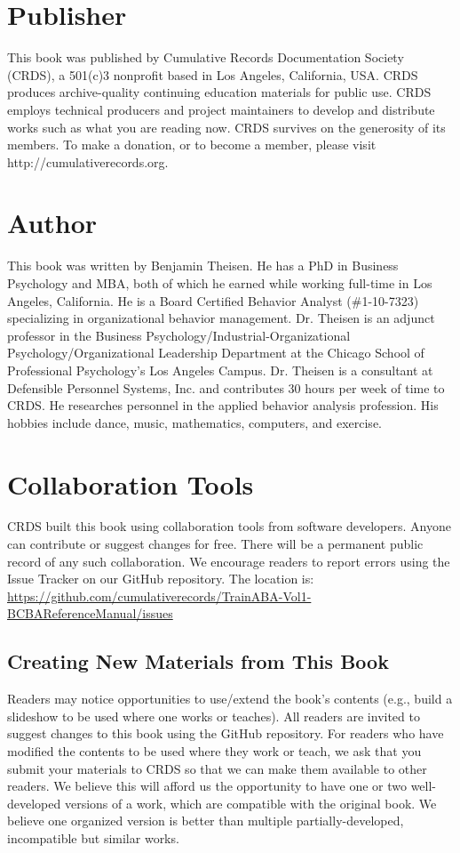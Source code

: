 \documentclass[float=false, crop=false]{standalone}
\begin{document}
\section{Publisher}
This book was published by Cumulative Records Documentation Society (CRDS), a 501(c)3 nonprofit based in Los Angeles, California, USA. CRDS produces archive-quality continuing education materials for public use. CRDS employs technical producers and project maintainers to develop and distribute works such as what you are reading now. CRDS survives on the generosity of its members. To make a donation, or to become a member, please visit http://cumulativerecords.org.

\section{Author}
This book was written by Benjamin Theisen. He has a PhD in Business Psychology and MBA, both of which he earned while working full-time in Los Angeles, California. He is a Board Certified Behavior Analyst (\#1-10-7323) specializing in organizational behavior management. Dr. Theisen is an adjunct professor in the Business Psychology/Industrial-Organizational Psychology/Organizational Leadership Department at the Chicago School of Professional Psychology's Los Angeles Campus. Dr. Theisen is a consultant at Defensible Personnel Systems, Inc. and contributes 30 hours per week of time to CRDS. He researches personnel in the applied behavior analysis profession. His hobbies include dance, music, mathematics, computers, and exercise.

\section{Collaboration Tools}
CRDS built this book using collaboration tools from software developers. Anyone can contribute or suggest changes for free. There will be a permanent public record of any such collaboration. We encourage readers to report errors using the Issue Tracker on our GitHub repository. The location is: \url{https://github.com/cumulativerecords/TrainABA-Vol1-BCBAReferenceManual/issues}

\subsection{Creating New Materials from This Book}
Readers may notice opportunities to use/extend the book's contents (e.g., build a slideshow to be used where one works or teaches). All readers are invited to suggest changes to this book using the GitHub repository. For readers who have modified the contents to be used where they work or teach, we ask that you submit your materials to CRDS so that we can make them available to other readers. We believe this will afford us the opportunity to have one or two well-developed versions of a work, which are compatible with the original book. We believe one organized version is better than multiple partially-developed, incompatible but similar works. 
\end{document}
